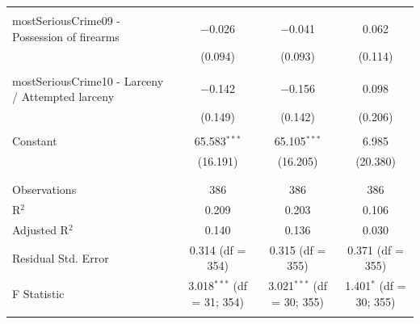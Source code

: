 \documentclass[a4paper,12pt]{article}
\begin{document}
\begin{table}[!htbp]
{\begin{tabular}{@{\extracolsep{5pt}}lccc}
  & & & \\ 
 mostSeriousCrime09 - Possession of firearms & $-$0.026 & $-$0.041 & 0.062 \\ 
  & (0.094) & (0.093) & (0.114) \\ 
  & & & \\ 
 mostSeriousCrime10 - Larceny / Attempted larceny & $-$0.142 & $-$0.156 & 0.098 \\ 
  & (0.149) & (0.142) & (0.206) \\ 
  & & & \\ 
  Constant & 65.583$^{***}$ & 65.105$^{***}$ & 6.985 \\ 
  & (16.191) & (16.205) & (20.380) \\ 
  & & & \\ 
\hline \\[-1.8ex] 
Observations & 386 & 386 & 386 \\ 
R$^{2}$ & 0.209 & 0.203 & 0.106 \\ 
Adjusted R$^{2}$ & 0.140 & 0.136 & 0.030 \\ 
Residual Std. Error & 0.314 (df = 354) & 0.315 (df = 355) & 0.371 (df = 355) \\ 
F Statistic & 3.018$^{***}$ (df = 31; 354) & 3.021$^{***}$ (df = 30; 355) & 1.401$^{*}$ (df = 30; 355) \\ 
\hline 
\hline \\[-1.8ex] 

\end{tabular} }
\end{table} 
\end{document}
